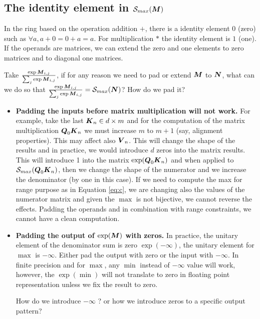 \documentclass[conference]{IEEEtran}
\begin{document}
\subsection{The identity element in $\Smax{\Vc{M}}$}
\label{sec:identity}

In the ring based on the operation addition $+$, there is a identity
element $0$ (zero) such as $\forall a, a+0 = 0+a = a$. For
multiplication $*$ the identity element is $1$ (one). If the operands
are matrices, we can extend the zero and one elements to zero matrices
and to diagonal one matrices.

Take $\frac{\exp{{\boldsymbol M}_{i,j}}}{\sum_j\exp{{\boldsymbol M}_{i,j}}}$, if for any reason we need to pad or extend
${\boldsymbol M}$ to ${\boldsymbol N}$, what can we do so that $\Smaxd{\Vc{M}}=
\Smax{\Vc{N}}$? How do we pad it?

\begin{itemize}
  \item {\bf Padding the inputs before matrix multiplication will not
    work.} For example, take the last ${\boldsymbol K}_n \in d\times m$ and for
    the computation of the matrix multiplication ${\boldsymbol Q}_0{\boldsymbol K}_n$ we
    must increase $m$ to $m+1$ (say, alignment properties). This may
    affect also ${\boldsymbol V}_n$.  This will change the shape of the results
    and in practice, we would introduce $d$ zeros into the matrix
    results. This will introduce 1 into the matrix
    $\exp({\boldsymbol Q}_0{\boldsymbol K}_n)$ and when applied to
    $\Smax{\Vc{Q}_0\Vc{K}_n}$, then we change the shape of the
    numerator and we increase the denominator (by one in this
    case). If we need to compute the max for range purpose as in
    Equation \ref{eq:c}, we are changing also the values of the
    numerator matrix and given the $\max$ is not bijective, we cannot
    reverse the effects. Padding the operands and in combination with
    range constraints, we cannot have a clean computation.

  \item {\bf Padding the output of $\exp({\boldsymbol M})$ with zeros.}  In
    practice, the unitary element of the denominator sum is zero
    $\exp(-\infty)$, the unitary element for $\max$ is $-\infty$.
    Either pad the output with zero or the input with $-\infty$. In
    finite precision and for $\max$, any $\min$ instead of $-\infty$
    value will work, however, the $\exp(\min)$ will not translate to
    zero in floating point representation unless we fix the result to
    zero.

    How do we introduce $-\infty$ ? or how we introduce zeros to a
    specific output pattern?

 
    
    

\end{itemize}
\end{document}
